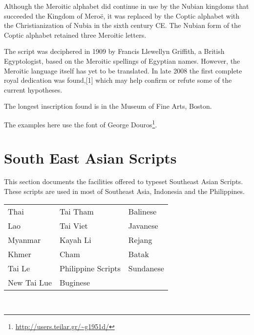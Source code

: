 Although the Meroitic alphabet did continue in use by the Nubian kingdoms that succeeded the Kingdom of Meroë, it was replaced by the Coptic alphabet with the Christianization of Nubia in the sixth century CE. The Nubian form of the Coptic alphabet retained three Meroitic letters.

The script was deciphered in 1909 by Francis Llewellyn Griffith, a British Egyptologist, based on the Meroitic spellings of Egyptian names. However, the Meroitic language itself has yet to be translated. In late 2008 the first complete royal dedication was found,[1] which may help confirm or refute some of the current hypotheses.

The longest inscription found is in the Museum of Fine Arts, Boston.

\newfontfamily{}

\begin{scriptexample}[]{}
%
\end{scriptexample}

The examples here use the  font of George Douros\footnote{\url{http://users.teilar.gr/~g1951d/}}.

\section{South East Asian Scripts}

This section documents the facilities offered to typeset Southeast Asian Scripts. These scripts are used in most of Southeast Asia, Indonesia and the Philippines.

\begin{table}[htb]
\centering
\begin{tabular}{lll}
Thai & Tai Tham &Balinese\\
Lao  &Tai Viet  &Javanese\\
Myanmar &Kayah Li &Rejang\\
Khmer &Cham &Batak\\
Tai Le &Philippine Scripts &Sundanese\\
New Tai Lue & Buginese\\
\end{tabular}
\end{table}

^^A
^^A
^^A
^^A
^^A
^^A
^^A
^^A
^^A
^^A
^^A
^^A
^^A
^^A

